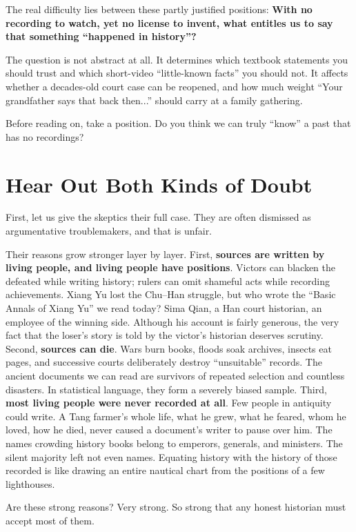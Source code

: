The real difficulty lies between these partly justified positions: \textbf{With no recording to watch, yet no license to invent, what entitles us to say that something ``happened in history''?}

The question is not abstract at all. It determines which textbook statements you should trust and which short-video ``little-known facts'' you should not. It affects whether a decades-old court case can be reopened, and how much weight ``Your grandfather says that back then...'' should carry at a family gathering.

Before reading on, take a position. Do you think we can truly ``know'' a past that has no recordings?

\section{Hear Out Both Kinds of Doubt}
First, let us give the skeptics their full case. They are often dismissed as argumentative troublemakers, and that is unfair.

Their reasons grow stronger layer by layer. First, \textbf{sources are written by living people, and living people have positions}. Victors can blacken the defeated while writing history; rulers can omit shameful acts while recording achievements. Xiang Yu lost the Chu--Han struggle, but who wrote the ``Basic Annals of Xiang Yu'' we read today? Sima Qian, a Han court historian, an employee of the winning side. Although his account is fairly generous, the very fact that the loser's story is told by the victor's historian deserves scrutiny. Second, \textbf{sources can die}. Wars burn books, floods soak archives, insects eat pages, and successive courts deliberately destroy ``unsuitable'' records. The ancient documents we can read are survivors of repeated selection and countless disasters. In statistical language, they form a severely biased sample. Third, \textbf{most living people were never recorded at all}. Few people in antiquity could write. A Tang farmer's whole life, what he grew, what he feared, whom he loved, how he died, never caused a document's writer to pause over him. The names crowding history books belong to emperors, generals, and ministers. The silent majority left not even names. Equating history with the history of those recorded is like drawing an entire nautical chart from the positions of a few lighthouses.

Are these strong reasons? Very strong. So strong that any honest historian must accept most of them.

